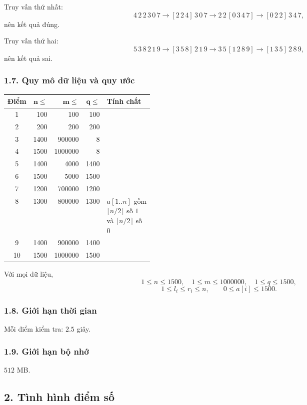 \documentclass[11pt]{article}
\begin{document}
Truy vấn thứ nhất:
\[
  4\,2\,2\,3\,0\,7
  \to [2\,2\,4]\,3\,0\,7
  \to 2\,2\,[0\,3\,4\,7]
  \to [0\,2\,2]\,3\,4\,7,
\]
nên kết quả đúng.

Truy vấn thứ hai:
\[
  5\,3\,8\,2\,1\,9
  \to [3\,5\,8]\,2\,1\,9
  \to 3\,5\,[1\,2\,8\,9]
  \to [1\,3\,5]\,2\,8\,9,
\]
nên kết quả sai.

\subsubsection*{1.7. Quy mô dữ liệu và quy ước}

\begin{center}
\begin{tabular}{c r r r p{0.34\linewidth}}
\textbf{Điểm} & \(\boldsymbol{n\le}\) & \(\boldsymbol{m\le}\) &
\(\boldsymbol{q\le}\) & \textbf{Tính chất} \\
\hline
1 & 100 & 100 & 100 & \\
2 & 200 & 200 & 200 & \\
3 & 1400 & 900000 & 8 & \\
4 & 1500 & 1000000 & 8 & \\
5 & 1400 & 4000 & 1400 & \\
6 & 1500 & 5000 & 1500 & \\
7 & 1200 & 700000 & 1200 & \\
8 & 1300 & 800000 & 1300 &
\(a[1..n]\) gồm \(\lfloor n/2\rfloor\) số \(1\) và
\(\lceil n/2\rceil\) số \(0\) \\
9 & 1400 & 900000 & 1400 & \\
10 & 1500 & 1000000 & 1500 &
\end{tabular}
\end{center}

Với mọi dữ liệu,
\[
  1\le n\le 1500,\quad 1\le m\le 1000000,\quad 1\le q\le 1500,
\]
\[
  1\le l_i\le r_i\le n,\qquad 0\le a[i]\le 1500.
\]

\subsubsection*{1.8. Giới hạn thời gian}

Mỗi điểm kiểm tra: \(2.5\) giây.

\subsubsection*{1.9. Giới hạn bộ nhớ}

\(512\) MB.

\subsection*{2. Tình hình điểm số}
\end{document}
